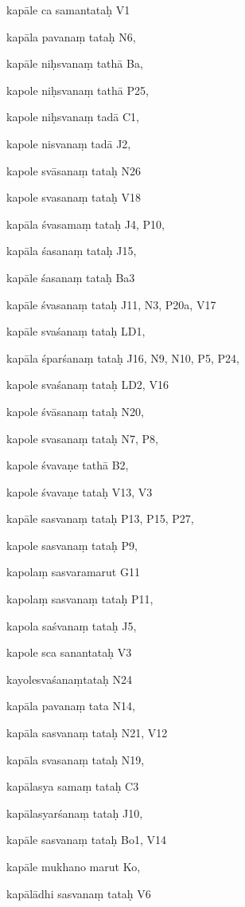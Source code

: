 \begin{marma}[hp02_009]
\begin{marma}[hp02_011]
\begin{marma}[hp02_62b]
\item[kapāle ca samantataḥ] V1 
\item[kapāla pavanaṃ tataḥ] N6, 
\item[kapāle niḥsvanaṃ tathā] Ba,
\item[kapole niḥsvanaṃ tathā] P25, 
\item[kapole niḥsvanaṃ tadā] C1, 
\item[kapole nisvanaṃ tadā] J2, 
\item[kapole svāsanaṃ tataḥ] N26
\item[kapole svasanaṃ tataḥ] V18
\item[kapāla śvasamaṃ tataḥ] J4, P10, 
\item[kapāla śasanaṃ tataḥ] J15, 
\item[kapāle śasanaṃ tataḥ] Ba3
\item[kapāle śvasanaṃ tataḥ] J11, N3, P20a, V17 
\item[kapāle svaśanaṃ tataḥ] LD1, 
\item[kapāla śparśanaṃ tataḥ] J16, N9, N10, P5, P24, 
\item[kapole svaśanaṃ tataḥ] LD2, V16
\item[kapole śvāsanaṃ tataḥ] N20, 
\item[kapole svasanaṃ tataḥ] N7, P8, 
\item[kapole śvavaṇe tathā] B2,
\item[kapole śvavaṇe tataḥ] V13, V3
\item[kapāle sasvanaṃ tataḥ] P13, P15, P27, 
\item[kapole sasvanaṃ tataḥ] P9,
\item[kapolaṃ sasvaramarut] G11
\item[kapolaṃ sasvanaṃ tataḥ] P11, 
\item[kapola saśvanaṃ tataḥ] J5,
\item[kapole sca sanantataḥ] V3
\item[kayolesvaśanaṃtataḥ] N24
\item[kapāla pavanaṃ tata] N14, 
\item[kapāla sasvanaṃ tataḥ] N21, V12
\item[kapāla svasanaṃ tataḥ] N19, 
\item[kapālasya samaṃ tataḥ] C3
\item[kapālasyarśanaṃ tataḥ] J10, 
\item[kapāle sasvanaṃ tataḥ] Bo1, V14
\item[kapāle mukhano marut] Ko,
\item[kapālādhi sasvanaṃ tataḥ] V6

\end{marma}
\end{marma}
\end{marma}
